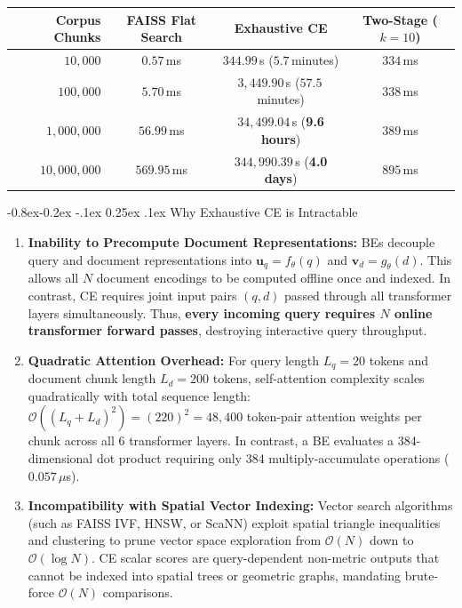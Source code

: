 \documentclass[11pt,a4paper]{article}
\makeatletter
\providecommand{\toprule}{\hline\hline}
\providecommand{\midrule}{\hline}
\providecommand{\bottomrule}{\hline\hline}
\newcommand{\captionof}[2]{%
  \def\@captype{#1}%
  \caption{#2}%
}
\renewcommand\subsection{\@startsection{subsection}{2}{\z@}%
  {-0.8ex\@plus -0.2ex \@minus -.1ex}%
  {0.25ex \@plus .1ex}%
  {\normalfont\normalsize\bfseries\color{primaryblue}}}
\newenvironment{tightcenter}{%
  \setlength\topsep{1.2pt}%
  \setlength\parskip{0pt}%
  \begin{center}%
}{%
  \end{center}%
}
\makeatother
\begin{document}
\begin{tightcenter}
\footnotesize
\setlength{\tabcolsep}{5pt}
\renewcommand{\arraystretch}{0.92}
\begin{tabular}{rccc}
\toprule
\textbf{Corpus Chunks} & \textbf{FAISS Flat Search} & \textbf{Exhaustive CE} & \textbf{Two-Stage ($k=10$)} \\
\midrule
$10,000$ & $0.57$\,ms & $344.99$\,s ($5.7$\,minutes) & $334$\,ms \\
$100,000$ & $5.70$\,ms & $3,449.90$\,s ($57.5$\,minutes) & $338$\,ms \\
$1,000,000$ & $56.99$\,ms & $34,499.04$\,s (\textbf{9.6 hours}) & $389$\,ms \\
$10,000,000$ & $569.95$\,ms & $344,990.39$\,s (\textbf{4.0 days}) & $895$\,ms \\
\bottomrule
\end{tabular}
\vspace{0.08em}
\captionof{table}{Theoretical scaling extrapolation: Exhaustive CE vs.\ Two-Stage RAG.}
\label{tab:extrapolation}
\end{tightcenter}

\subsection{Why Exhaustive CE is Intractable}
\begin{enumerate}
  \setlength{\itemsep}{0.5pt}\setlength{\parskip}{0pt}
  \item \textbf{Inability to Precompute Document Representations:} BEs decouple query and document representations into $\mathbf{u}_q = f_\theta(q)$ and $\mathbf{v}_d = g_\theta(d)$. This allows all $N$ document encodings to be computed offline once and indexed. In contrast, CE requires joint input pairs $(q, d)$ passed through all transformer layers simultaneously. Thus, \textbf{every incoming query requires $N$ online transformer forward passes}, destroying interactive query throughput.
  \item \textbf{Quadratic Attention Overhead:} For query length $L_q = 20$ tokens and document chunk length $L_d = 200$ tokens, self-attention complexity scales quadratically with total sequence length: $\mathcal{O}((L_q + L_d)^2) = (220)^2 = 48,400$ token-pair attention weights per chunk across all 6 transformer layers. In contrast, a BE evaluates a 384-dimensional dot product requiring only 384 multiply-accumulate operations ($0.057$\,$\mu$s).
  \item \textbf{Incompatibility with Spatial Vector Indexing:} Vector search algorithms (such as FAISS IVF, HNSW, or ScaNN) exploit spatial triangle inequalities and clustering to prune vector space exploration from $\mathcal{O}(N)$ down to $\mathcal{O}(\log N)$. CE scalar scores are query-dependent non-metric outputs that cannot be indexed into spatial trees or geometric graphs, mandating brute-force $\mathcal{O}(N)$ comparisons.
\end{enumerate}
\end{document}

